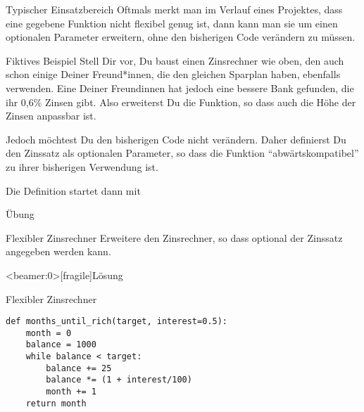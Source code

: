 \begin{frame}
\begin{block}{Typischer Einsatzbereich}
\vspace{2pt}
Oftmals merkt man im Verlauf eines Projektes, dass eine gegebene Funktion nicht flexibel genug ist, dann kann man sie um einen optionalen Parameter erweitern, ohne den bisherigen Code verändern zu müssen. 
\end{block}

\vspace{12pt}

\pause 

\begin{exampleblock}{Fiktives Beispiel}
\vspace{2pt}
Stell Dir vor, Du baust einen Zinsrechner wie oben, den auch schon einige Deiner Freund*innen, die den gleichen Sparplan haben, ebenfalls verwenden. Eine Deiner Freundinnen hat jedoch eine bessere Bank gefunden, die ihr 0,6\% Zinsen gibt. Also erweiterst Du die Funktion, so dass auch die Höhe der Zinsen anpassbar ist.   

\pause

Jedoch möchtest Du den bisherigen Code nicht verändern. Daher definierst Du den Zinssatz als optionalen Parameter, so dass die Funktion \enquote{abwärtskompatibel} zu ihrer bisherigen Verwendung ist.

\pause 
Die Definition startet dann mit  
 
\end{exampleblock}

\end{frame}

\begin{frame}{Übung}
\begin{block}{Flexibler Zinsrechner}
\vspace{2pt}
Erweitere den Zinsrechner, so dass optional der Zinssatz angegeben werden kann. 	
\end{block}
\end{frame}

\begin{frame}<beamer:0>[fragile]{Lösung}

\begin{solutionblock}{Flexibler Zinsrechner}
\begin{verbatim}
def months_until_rich(target, interest=0.5):
    month = 0
    balance = 1000
    while balance < target:
        balance += 25
        balance *= (1 + interest/100)
        month += 1
    return month
\end{verbatim}
\end{solutionblock}
\end{frame}




